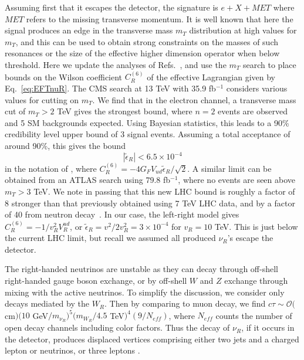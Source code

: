 \documentclass[letterpaper,11pt]{article}
\newcommand{\beq}{\begin{equation}}
\newcommand{\eeq}{\end{equation}}
\newcommand{\Or}{\mathcal O}
\newcommand{\sq}{^{2}}
\begin{document}
Assuming first that it escapes the detector, the signature is $e+X+MET$ where $MET$ refers to the missing transverse momentum. It is well known that here the signal produces an edge in the 
transverse mass $m_T$ distribution at high values for $m_T$, and this can be used to obtain strong constraints on the masses of such resonances or the size of the effective higher dimension operator when below threshold. Here we update the 
analyses of Refs.~\cite{Cirigliano:2012ab,Gonzalez-Alonso:2013uqa,Gonzalez-Alonso:2018omy}, and use the $m_T$ search to place bounds on the Wilson coefficient $C^{(6)}_R$ of the effective Lagrangian given by 
Eq.~\eqref{eq:EFTnuR}. The CMS search at 13 TeV with 35.9 fb$^{-1}$ \cite{Sirunyan:2018mpc} considers various values for cutting on $m_T$. We find that in the electron channel, a transverse mass cut of  $m_T> 2$ TeV gives
the strongest bound, where $n=2$ events are observed and
 5 SM backgrounds expected. Using Bayesian statistics, this leads to a 90\% credibility level upper bound of 3 signal events. Assuming a total acceptance of around 90\%, this gives the bound 
 \beq
 |\tilde{\epsilon}_R |< 6.5 \times 10^{-4}
 \eeq
 in the notation of \cite{Cirigliano:2012ab}, where $C^{(6)}_R=-4 G_F V_{ud} \tilde{\epsilon}_R/\sqrt{2}$. A similar limit can be obtained 
 from an ATLAS search \cite{ATLAS:2018MT} using $79.8$ fb$^{-1}$, where no events are seen above $m_T > 3$ TeV. We note in passing that 
 this new LHC bound is roughly a factor of 8 stronger than that previously obtained using 7 TeV LHC data, and by a factor of 40 from neutron decay~\cite{Gonzalez-Alonso:2018omy}.
 In our case, the left-right model gives $C^{(6)}_R=- 1/v_R\sq V_R^{ud}$, or
 $\tilde{\epsilon}_R=v^2/2v_R^2=3 \times 10^{-4}$ for $v_R=10$ TeV. This is just below the current LHC limit, but recall we assumed all produced $\nu_R$'s escape the detector. 

The right-handed neutrinos are unstable as they can decay through off-shell right-handed gauge boson exchange, or by off-shell $W$ and $Z$ exchange through mixing with the active neutrinos.
To simplify the discussion, we consider only decays mediated by the $W_R$. Then by comparing to muon decay, we find $c \tau \sim \Or($cm$)(10$ GeV$/m_{\nu_R})^{5} (m_{W_R}/4.5$ TeV$)^{4} (9/N_{eff})$, where $N_{eff}$ counts the number of open decay channels including color factors. Thus the decay of $\nu_R$, if it occurs in the detector, produces displaced vertices comprising either two jets and a charged lepton or neutrinos, 
or three leptons \cite{Graesser:2007yj,Graesser:2007pc}. 
\end{document}
